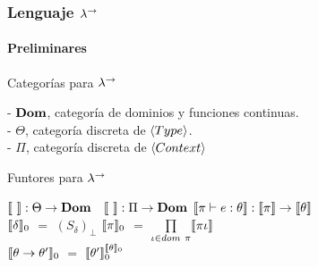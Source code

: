 \documentclass{beamer}
\begin{document}
\begin{frame}
\frametitle{Lenguaje $\lambda^{\rightarrow}$}
\framesubtitle{Preliminares}

\begin{block}{Categorías para $\lambda^{\rightarrow}$}

- $\textbf{Dom}$, categoría de dominios y funciones continuas.\\
- $\Theta$, categoría discreta de $\langle Type \rangle$.\\
- $\Pi$, categoría discreta de $\langle Context \rangle$

\end{block}

\pause

\begin{block}{Funtores para $\lambda^{\rightarrow}$}

$\llbracket  \  \rrbracket : \Theta \rightarrow \textbf{Dom}$ 
\quad \quad \quad \
$\llbracket  \  \rrbracket : \Pi \rightarrow \textbf{Dom}$
\quad \quad \quad
$\llbracket \pi \vdash e : \theta \rrbracket : \llbracket \pi \rrbracket \rightarrow \llbracket \theta \rrbracket$\\
$\llbracket \delta \rrbracket_0$ $=$ $(S_\delta)_\bot$
\quad \quad \quad \quad
$\llbracket \pi \rrbracket_0$ $=$ $\prod\limits_{\iota \in dom \ \pi} \llbracket \pi\iota \rrbracket$\\
$\llbracket \theta \rightarrow \theta' \rrbracket_0$ $=$ $\llbracket \theta' \rrbracket_0^{\llbracket \theta \rrbracket_0}$

\end{block}

\end{frame}
\end{document}
